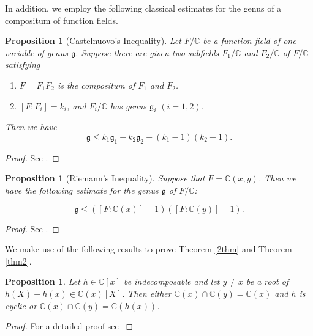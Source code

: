 \documentclass[12pt]{amsart}
\newtheorem{proposition}[theorem]{Proposition}
\begin{document}
    
In addition, we employ the following classical estimates for the genus of a compositum of function fields.
\begin{proposition}[Castelnuovo's Inequality]\label{castelnuvothm}
     Let $F/\mathbb{C}$ be a function field of one variable of genus $\mathfrak{g}$. Suppose there are given two subfields $F_1/\mathbb{C}$ and $F_2/\mathbb{C}$ of $F/\mathbb{C}$ satisfying  

     \begin{enumerate}
     \item[(1)] $F = F_1F_2$ is the compositum of $F_1$ and $F_2$.
     \item[(2)] $[F:F_i] = k_i$, and $F_i/\mathbb{C}$ has genus $\mathfrak{g}_i$ $(i=1,2)$.
     \end{enumerate}

     Then we have
     \[
      \mathfrak{g} \leq k_1 \mathfrak{g}_1 + k_2 \mathfrak{g}_2 + (k_1 - 1)(k_2 - 1).
    \]
\end{proposition}
\begin{proof}
    See \cite[pp.~130]{stichtenoth2009algebraic}.
\end{proof}

\begin{proposition}[Riemann's Inequality]\label{nthm5}
    Suppose that 
$F = \mathbb{C}(x,y)$. Then we have the following estimate for the genus $\mathfrak{g}$ of $F/\mathbb{C}$:

\[
\mathfrak{g} \leq ([F:\mathbb{C}(x)] - 1)([F:\mathbb{C}(y)] - 1).
\]
\end{proposition}
\begin{proof}
    See \cite[pp.~132]{stichtenoth2009algebraic}.
\end{proof}

 We make use of the following results to prove Theorem \ref{2thm} and Theorem \ref{thm2}.

    \begin{proposition}\label{lem3.3}
Let $h \in \mathbb{C}[x]$ be indecomposable and let $y \neq x$ be a root of 
$h(X) - h(x) \in \mathbb{C}(x)[X]$. Then either 
$\mathbb{C}(x) \cap \mathbb{C}(y) = \mathbb{C}(x)$ and $h$ is cyclic or 
$\mathbb{C}(x) \cap \mathbb{C}(y) = \mathbb{C}(h(x))$.
\end{proposition}
\begin{proof}
    For a detailed proof see \cite[Lemma 4]{fuchs2019decomposable} 
\end{proof}
\end{document}

